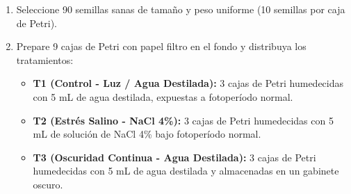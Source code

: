 \documentclass[
  spanish,
  10pt,
  letterpaper,
  twocolumn]{article}
\providecommand{\tightlist}{%
  \setlength{\itemsep}{0pt}\setlength{\parskip}{0pt}}
\begin{document}
\begin{enumerate}
\def\labelenumi{\arabic{enumi}.}
\tightlist
\item
  Seleccione 90 semillas sanas de tamaño y peso uniforme (10 semillas
  por caja de Petri).
\item
  Prepare 9 cajas de Petri con papel filtro en el fondo y distribuya los
  tratamientos:

  \begin{itemize}
  \tightlist
  \item
    \textbf{T1 (Control - Luz / Agua Destilada):} 3 cajas de Petri
    humedecidas con 5 mL de agua destilada, expuestas a fotoperíodo
    normal.
  \item
    \textbf{T2 (Estrés Salino - NaCl 4\%):} 3 cajas de Petri humedecidas
    con 5 mL de solución de NaCl 4\% bajo fotoperíodo normal.
  \item
    \textbf{T3 (Oscuridad Continua - Agua Destilada):} 3 cajas de Petri
    humedecidas con 5 mL de agua destilada y almacenadas en un gabinete
    oscuro.
  \end{itemize}
\end{enumerate}
\end{document}
